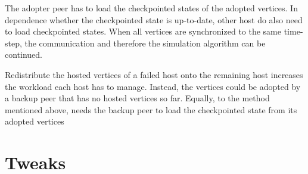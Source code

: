  The adopter peer has to load the checkpointed states of the
  adopted vertices. In dependence whether the checkpointed state is
  up-to-date, other host do also need to load checkpointed
  states. When all vertices are synchronized to the same time-step,
  the communication and therefore the simulation algorithm can be
  continued.


 Redistribute the hosted vertices of a failed host onto the
  remaining host increases the workload each host has to manage.
  Instead, the vertices could be adopted by a backup peer that has no
  hosted vertices so far.  Equally, to the method mentioned above,
  needs the backup peer to load the checkpointed state from its
  adopted vertices

\section*{Tweaks}



\cleardoublepage

